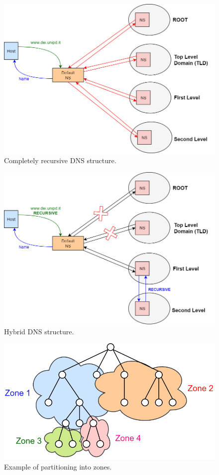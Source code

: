 \begin{figure}[h]
\centering
\includegraphics[scale=0.4]{Images/Resolution/default_DNS}
\caption{\footnotesize{Completely recursive DNS structure.}}\label{recursive_DNS}
\end{figure}
\begin{figure}[h]
\centering
\includegraphics[scale=0.4]{Images/Resolution/hybrid_DNS}
\caption{\footnotesize{Hybrid DNS structure.}}\label{hybrid_DNS}
\end{figure}
\begin{figure}[h]
\centering
\includegraphics[scale=0.4]{Images/Resolution/DNS_zone}
\caption{\footnotesize{Example of partitioning into zones.}}\label{DNS_zone}
\end{figure}